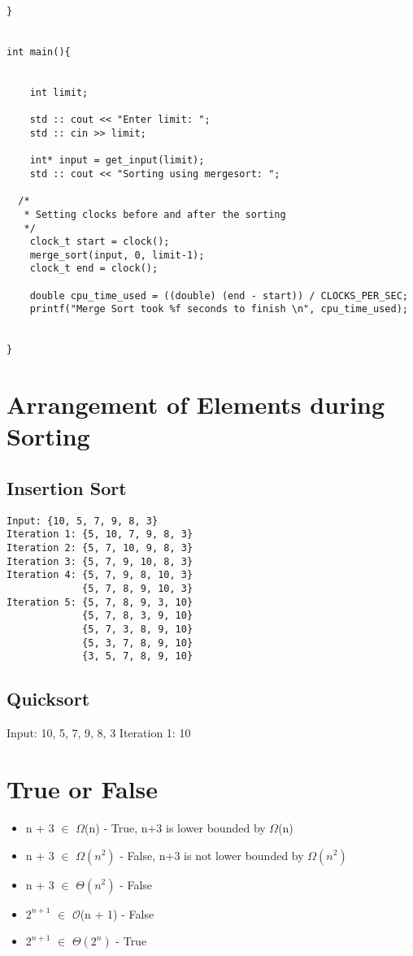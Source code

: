 \documentclass{article}
\begin{document}
\begin{verbatim}
}


int main(){


    int limit;
    
    std :: cout << "Enter limit: ";
    std :: cin >> limit;

    int* input = get_input(limit);
    std :: cout << "Sorting using mergesort: ";
    
  /*
   * Setting clocks before and after the sorting
   */    
    clock_t start = clock();
    merge_sort(input, 0, limit-1);
    clock_t end = clock();

    double cpu_time_used = ((double) (end - start)) / CLOCKS_PER_SEC;
    printf("Merge Sort took %f seconds to finish \n", cpu_time_used);


}

\end{verbatim}

\section{Arrangement of Elements during Sorting}
\subsection{Insertion Sort}
\begin{verbatim}
Input: {10, 5, 7, 9, 8, 3}
Iteration 1: {5, 10, 7, 9, 8, 3}
Iteration 2: {5, 7, 10, 9, 8, 3}
Iteration 3: {5, 7, 9, 10, 8, 3}
Iteration 4: {5, 7, 9, 8, 10, 3}
             {5, 7, 8, 9, 10, 3}
Iteration 5: {5, 7, 8, 9, 3, 10}
             {5, 7, 8, 3, 9, 10}
             {5, 7, 3, 8, 9, 10}
             {5, 3, 7, 8, 9, 10}
             {3, 5, 7, 8, 9, 10}
\end{verbatim}

\subsection{Quicksort}
Input: {10, 5, 7, 9, 8, 3}
Iteration 1: {10}

\section{True or False}

\begin{itemize}
\item n + 3 $\in$ $\Omega$(n) - True, n+3 is lower bounded by $\Omega$(n)

\item n + 3 $\in$ $\Omega(n^{2})$ - False, n+3 is not lower bounded by $\Omega(n^{2})$

\item n + 3 $\in$ $\Theta(n^{2})$ - False

\item $2^{n+1}$ $\in$ $\mathcal{O}$(n + 1) - False

\item $2^{n+1}$ $\in$ $\Theta(2^{n})$ - True

\end{itemize}
\end{document}
